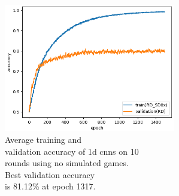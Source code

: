 \begin{minipage}{0.5\textwidth}
	\begin{figure}[H]
		\centering
		\includegraphics[width=7.5cm]{images/bestHistories/1d_20s_sd0x_acc.png}
		\caption[Bild kurz]{Average training and \\\hspace{0\textwidth}validation accuracy of 1d cnns on 10\\\hspace{0\textwidth} rounds using no simulated games.\\\hspace{0\textwidth} Best validation accuracy\\\hspace{0\textwidth} is 81.12\% at epoch 1317.}
		\label{fig:1d20}
	\end{figure}
\end{minipage}

